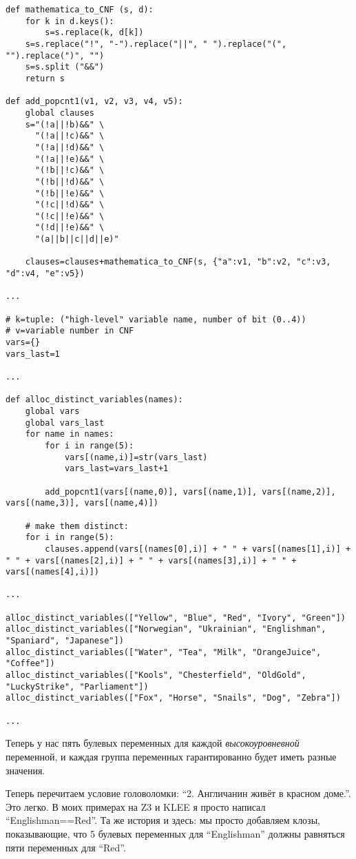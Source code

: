 \begin{lstlisting}
def mathematica_to_CNF (s, d):
    for k in d.keys():
        s=s.replace(k, d[k])
    s=s.replace("!", "-").replace("||", " ").replace("(", "").replace(")", "")
    s=s.split ("&&")
    return s

def add_popcnt1(v1, v2, v3, v4, v5):
    global clauses
    s="(!a||!b)&&" \
      "(!a||!c)&&" \
      "(!a||!d)&&" \
      "(!a||!e)&&" \
      "(!b||!c)&&" \
      "(!b||!d)&&" \
      "(!b||!e)&&" \
      "(!c||!d)&&" \
      "(!c||!e)&&" \
      "(!d||!e)&&" \
      "(a||b||c||d||e)"

    clauses=clauses+mathematica_to_CNF(s, {"a":v1, "b":v2, "c":v3, "d":v4, "e":v5})

...

# k=tuple: ("high-level" variable name, number of bit (0..4))
# v=variable number in CNF
vars={}
vars_last=1

...

def alloc_distinct_variables(names):
    global vars
    global vars_last
    for name in names:
        for i in range(5):
            vars[(name,i)]=str(vars_last)
            vars_last=vars_last+1

        add_popcnt1(vars[(name,0)], vars[(name,1)], vars[(name,2)], vars[(name,3)], vars[(name,4)])

    # make them distinct:
    for i in range(5):
        clauses.append(vars[(names[0],i)] + " " + vars[(names[1],i)] + " " + vars[(names[2],i)] + " " + vars[(names[3],i)] + " " + vars[(names[4],i)])

...

alloc_distinct_variables(["Yellow", "Blue", "Red", "Ivory", "Green"])
alloc_distinct_variables(["Norwegian", "Ukrainian", "Englishman", "Spaniard", "Japanese"])
alloc_distinct_variables(["Water", "Tea", "Milk", "OrangeJuice", "Coffee"])
alloc_distinct_variables(["Kools", "Chesterfield", "OldGold", "LuckyStrike", "Parliament"])
alloc_distinct_variables(["Fox", "Horse", "Snails", "Dog", "Zebra"])

...

\end{lstlisting}

Теперь у нас пять булевых переменных для каждой \textit{высокоуровневной} переменной,
и каждая группа переменных гарантированно будет иметь разные значения.

Теперь перечитаем условие головоломки: ``2. Англичанин живёт в красном доме.''.
Это легко.
В моих примерах на Z3 и KLEE я просто написал ``Englishman==Red''.
Та же история и здесь: мы просто добавляем клозы, показывающие, что 5 булевых переменных для ``Englishman''
должны равняться пяти переменных для ``Red''.


